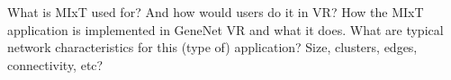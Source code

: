 What is MIxT used for? And how would users do it in VR?
How the MIxT application is implemented in GeneNet VR and what it does.
What are typical network characteristics for this (type of) application? Size, clusters, edges, connectivity, etc?
